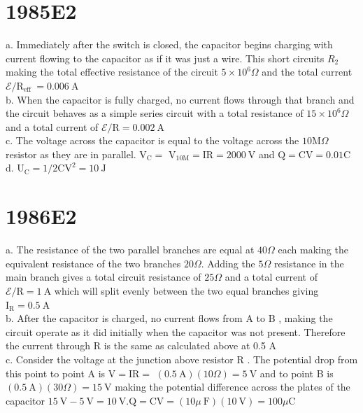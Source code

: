 \begin{enumerate}
\section*{1985E2}
a. Immediately after the switch is closed, the capacitor begins charging with current flowing to the capacitor as if it was just a wire. This short circuits $R_{2}$ making the total effective resistance of the circuit $5 \times 10^{6} \Omega$ and the total current $\mathcal{E} / \mathrm{R}_{\text {eff }}=0.006 \mathrm{~A}$\\
b. When the capacitor is fully charged, no current flows through that branch and the circuit behaves as a simple series circuit with a total resistance of $15 \times 10^{6} \Omega$ and a total current of $\boldsymbol{\mathcal { E }} / \mathrm{R}=0.002 \mathrm{~A}$\\
c. The voltage across the capacitor is equal to the voltage across the $10 \mathrm{M} \Omega$ resistor as they are in parallel. $\mathrm{V}_{\mathrm{C}}=$ $\mathrm{V}_{10 \mathrm{M}}=\mathrm{IR}=2000 \mathrm{~V}$ and $\mathrm{Q}=\mathrm{CV}=0.01 \mathrm{C}$\\
d. $\mathrm{U}_{\mathrm{C}}=1 / 2 \mathrm{CV}^{2}=10 \mathrm{~J}$

\section*{1986E2}
a. The resistance of the two parallel branches are equal at $40 \Omega$ each making the equivalent resistance of the two branches $20 \Omega$. Adding the $5 \Omega$ resistance in the main branch gives a total circuit resistance of $25 \Omega$ and a total current of $\mathcal{E} / \mathrm{R}=1 \mathrm{~A}$ which will split evenly between the two equal branches giving $\mathrm{I}_{\mathrm{R}}=0.5 \mathrm{~A}$\\
b. After the capacitor is charged, no current flows from A to B , making the circuit operate as it did initially when the capacitor was not present. Therefore the current through R is the same as calculated above at 0.5 A\\
c. Consider the voltage at the junction above resistor R . The potential drop from this point to point A is $\mathrm{V}=\mathrm{IR}=$ $(0.5 \mathrm{~A})(10 \Omega)=5 \mathrm{~V}$ and to point B is $(0.5 \mathrm{~A})(30 \Omega)=15 \mathrm{~V}$ making the potential difference across the plates of the capacitor $15 \mathrm{~V}-5 \mathrm{~V}=10 \mathrm{~V} . \mathrm{Q}=\mathrm{CV}=(10 \mu \mathrm{~F})(10 \mathrm{~V})=100 \mu \mathrm{C}$


\end{enumerate}
